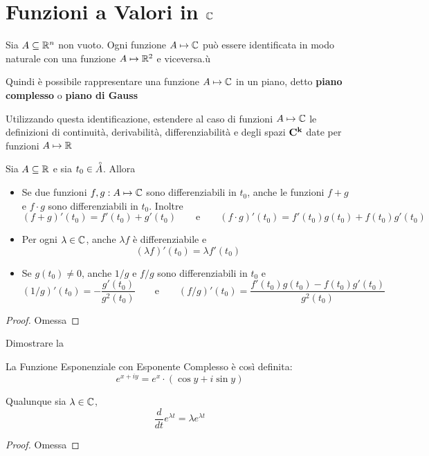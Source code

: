 \section{Funzioni a Valori in \texorpdfstring{$\protect\mathbb{C}$}{C}}
\label{sec:fun_in_C}
Sia $A \subseteq \mathbb{R}^n$ non vuoto. Ogni funzione $A \mapsto \mathbb{C}$ può essere identificata in modo naturale con una funzione $A \mapsto \mathbb{R}^2$ e viceversa.ù
\begin{note}
	Quindi è possibile rappresentare una funzione $A \mapsto \mathbb{C}$ in un piano, detto \textbf{piano complesso} o \textbf{piano di Gauss}
\end{note}
\begin{exercise}
	\label{ex:ext_def_in_C}
	Utilizzando questa identificazione, estendere al caso di funzioni $A \mapsto \mathbb{C}$ le definizioni di continuità, derivabilità, differenziabilità e degli spazi $\mathbf{C^{k}}$ date per funzioni $A \mapsto \mathbb{R}$
\end{exercise}
\begin{proposition}
	\label{prop:fg_in_C}
	Sia $A \subseteq \mathbb{R}$ e sia $t_0 \in \accentset{\circ}{A}$. Allora
	\begin{itemize}
		\item Se due funzioni $f,g: A \mapsto \mathbb{C}$ sono differenziabili in $t_0$, anche le funzioni $f+g$ e $f \cdot g$ sono differenziabili in $t_0$. Inoltre
			\[(f+g)'(t_0) = f'(t_0) + g'(t_0) \qquad\text{e}\qquad (f \cdot g)'(t_0) = f'(t_0)g(t_0)+f(t_0)g'(t_0)\]
		\item Per ogni $\lambda \in \mathbb{C}$, anche $\lambda f$ è differenziabile e
			\[(\lambda f)'(t_0) = \lambda f'(t_0)\]
		\item Se $g(t_0) \neq 0$, anche $1/g$ e $f/g$ sono differenziabili in $t_0$ e
			\[(1/g)'(t_0) = - \frac{g'(t_0)}{g^2(t_0)} \qquad\text{e}\qquad (f/g)'(t_0) = \frac{f'(t_0)g(t_0)-f(t_0)g'(t_0)}{g^2(t_0)}\]
	\end{itemize}
	\begin{proof}
		Omessa
	\end{proof}
\end{proposition}
\begin{exercise}
	Dimostrare la 
\end{exercise}
\begin{definition}
	La Funzione Esponenziale con Esponente Complesso è così definita:
	\[e^{x+iy} = e^x \cdot (\cos y + i \sin y)\]
\end{definition}
\begin{proposition}
	\label{prop:deriv_exp_in_C}
	Qualunque sia $\lambda \in \mathbb{C}$,
	\[\frac{d}{dt}e^{\lambda t} = \lambda e^{\lambda t}\]
	\begin{proof}
		Omessa
	\end{proof}
\end{proposition}
